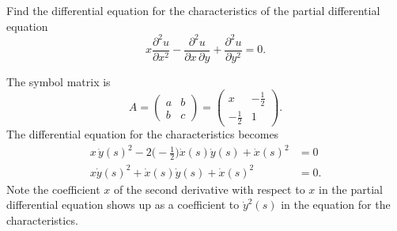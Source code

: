 Find the differential equation for the characteristics of the
partial differential equation
\[
x\frac{\partial^2 u}{\partial x^2}
-\frac{\partial^2 u}{\partial x\,\partial y}
+
\frac{\partial^2 u}{\partial y^2}
=
0.
\]

\begin{loesung}
The symbol matrix is
\[
A
=
\begin{pmatrix}
a&b\\
b&c
\end{pmatrix}
=
\begin{pmatrix}
x&-\frac12\\
-\frac12&1
\end{pmatrix}.
\]
The differential equation for the characteristics becomes
\begin{align*}
x\, \dot{y}(s)^2 - 2\biggl(-\frac12\biggr) \dot{x}(s)\dot{y}(s) + \dot{x}(s)^2
&=
0
\\
x\dot{y}(s)^2 +\dot{x}(s)\dot{y}(s) +\dot{x}(s)^2 &=0.
\end{align*}
Note the coefficient $x$ of the second derivative with respect to $x$
in the partial differential equation shows up as a coefficient to
$\dot{y}^2(s)$ in the equation for the characteristics.
\end{loesung}


